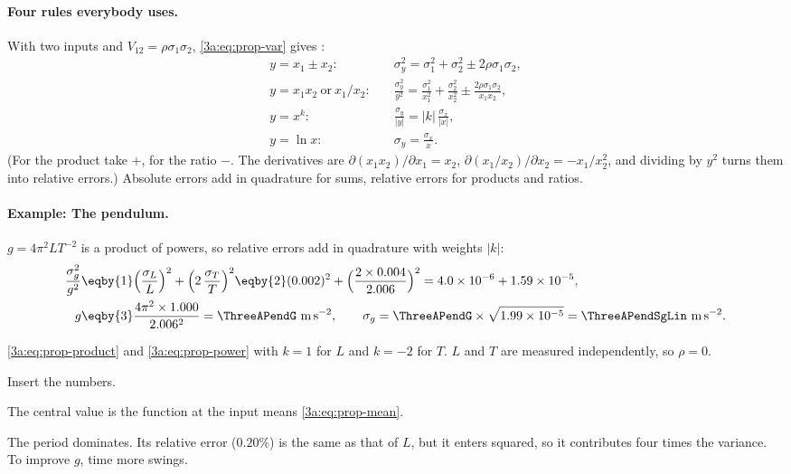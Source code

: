 \paragraph{Four rules everybody uses.}
With two inputs and $V_{12}=\rho\sigma_1\sigma_2$, \eqref{3a:eq:prop-var}
gives :
\begin{align}
  y=x_1\pm x_2:&\quad \sigma_y^2=\sigma_1^2+\sigma_2^2\pm2\rho\sigma_1\sigma_2,
  \label{3a:eq:prop-sum}\\
  y=x_1x_2\ \text{or}\ x_1/x_2:&\quad
  \frac{\sigma_y^2}{y^2}=\frac{\sigma_1^2}{x_1^2}+\frac{\sigma_2^2}{x_2^2}\pm\frac{2\rho\sigma_1\sigma_2}{x_1x_2},
  \label{3a:eq:prop-product}\\
  y=x^k:&\quad \frac{\sigma_y}{|y|}=|k|\,\frac{\sigma_x}{|x|},
  \label{3a:eq:prop-power}\\
  y=\ln x:&\quad \sigma_y=\frac{\sigma_x}{x}.
  \label{3a:eq:prop-log}
\end{align}
(For the product take $+$, for the ratio $-$. The derivatives are
$\partial(x_1x_2)/\partial x_1=x_2$, $\partial(x_1/x_2)/\partial x_2=-x_1/x_2^2$,
and dividing by $y^2$ turns them into relative errors.) Absolute errors add
in quadrature for sums, relative errors for products and ratios.

\paragraph{Example: The pendulum.}
\label{3a:ex:pendulum-prop}
$g=4\pi^2LT^{-2}$ is a product of powers, so relative errors add in
quadrature with weights $|k|$:
\begin{align*}
  \frac{\sigma_g^2}{g^2}
  &\eqby{1} \Bigl(\frac{\sigma_L}{L}\Bigr)^2+\Bigl(2\,\frac{\sigma_T}{T}\Bigr)^2
   \eqby{2} (0.002)^2+\Bigl(\frac{2\times0.004}{2.006}\Bigr)^2
   = 4.0\times10^{-6}+1.59\times10^{-5},\\
  g &\eqby{3} \frac{4\pi^2\times1.000}{2.006^2}=\ThreeAPendG\ \mathrm{m\,s^{-2}},\qquad
  \sigma_g=\ThreeAPendG\times\sqrt{1.99\times10^{-5}}=\ThreeAPendSgLin\ \mathrm{m\,s^{-2}}.
\end{align*}
\begin{explain}
  \item \eqref{3a:eq:prop-product} and \eqref{3a:eq:prop-power} with $k=1$ for $L$
        and $k=-2$ for $T$. $L$ and $T$ are measured independently, so $\rho=0$.
  \item Insert the numbers.
  \item The central value is the function at the input means \eqref{3a:eq:prop-mean}.
\end{explain}
The period dominates. Its relative error ($0.20\%$) is the same as that of
$L$, but it enters squared, so it contributes four times the variance. To
improve $g$, time more swings.

